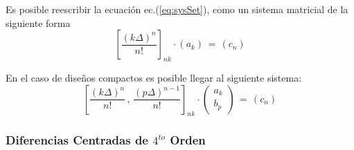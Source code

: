 \documentclass[9pt,technote,twoside,letterpaper,onecolumn]{IEEEtran}
\begin{document}
\begin{multicols}{2}
Es posible reescribir la ecuación ec.(\ref{eq:sysSet}), como un sistema matricial de la siguiente forma
\begin{equation}
  \left[\frac{(k\Delta)^n}{n!}\right]_{nk}\cdot\left(a_k\right)\,=\,\left(c_n\right)
  \label{eq:designStencil}
\end{equation}

En el caso de diseños compactos es posible llegar al siguiente sistema:
\begin{equation}
  \left[\frac{(k\Delta)^n}{n!}\,,\,\frac{(p\Delta)^{n-1}}{n!}\right]_{nk}\cdot\left(
  \begin{array}{c}
a_k\\
b_p
  \end{array}
\right)\,=\,\left(c_n\right)
  \label{eq:designCompactStencil}
\end{equation}

\subsubsection{Diferencias Centradas de $4^{to}$ Orden}
\label{sec:cds4}


\end{multicols}
\end{document}
